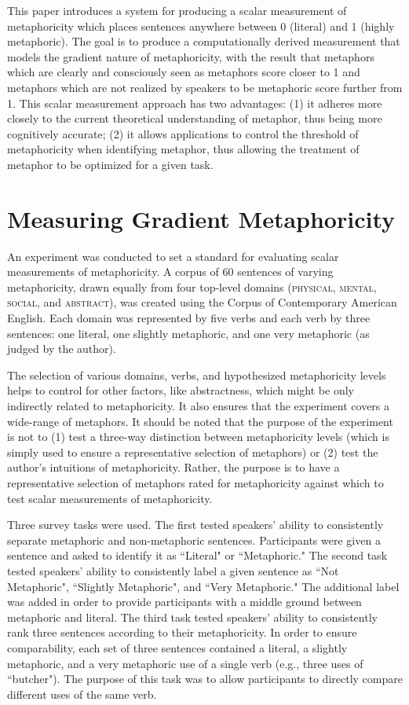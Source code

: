\documentclass[11pt]{article}
\begin{document}
This paper introduces a system for producing a scalar measurement of metaphoricity which places sentences anywhere between 0 (literal) and 1 (highly metaphoric). The goal is to produce a computationally derived measurement that models the gradient nature of metaphoricity, with the result that metaphors which are clearly and consciously seen as metaphors score closer to 1 and metaphors which are not realized by speakers to be metaphoric score further from 1. This scalar measurement approach has two advantages: (1) it adheres more closely to the current theoretical understanding of metaphor, thus being more cognitively accurate; (2) it allows applications to control the threshold of metaphoricity when identifying metaphor, thus allowing the treatment of metaphor to be optimized for a given task.

\section{Measuring Gradient Metaphoricity}

An experiment was conducted to set a standard for evaluating scalar measurements of metaphoricity. A corpus of 60 sentences of varying metaphoricity, drawn equally from four top-level domains (\textsc{physical, mental, social}, and \textsc{abstract}), was created using the Corpus of Contemporary American English.  Each domain was represented by five verbs and each verb by three sentences: one literal, one slightly metaphoric, and one very metaphoric (as judged by the author). 

The selection of various domains, verbs, and hypothesized metaphoricity levels helps to control for other factors, like abstractness, which might be only indirectly related to metaphoricity. It also ensures that the experiment covers a wide-range of metaphors. It should be noted that the purpose of the experiment is not to (1) test a three-way distinction between metaphoricity levels (which is simply used to ensure a representative selection of metaphors) or (2) test the author's intuitions of metaphoricity. Rather, the purpose is to have a representative selection of metaphors rated for metaphoricity against which to test scalar measurements of metaphoricity.

Three survey tasks were used. The first tested speakers' ability to consistently separate metaphoric and non-metaphoric sentences. Participants were given a sentence and asked to identify it as ``Literal" or ``Metaphoric."  The second task tested speakers' ability to consistently label a given sentence as ``Not Metaphoric", ``Slightly Metaphoric", and ``Very Metaphoric." The additional label was added in order to provide participants with a middle ground between metaphoric and literal. The third task tested speakers' ability to consistently rank three sentences according to their metaphoricity. In order to ensure comparability, each set of three sentences contained a literal, a slightly metaphoric, and a very metaphoric use of a single verb (e.g., three uses of  ``butcher"). The purpose of this task was to allow participants to directly compare different uses of the same verb.
\end{document}

